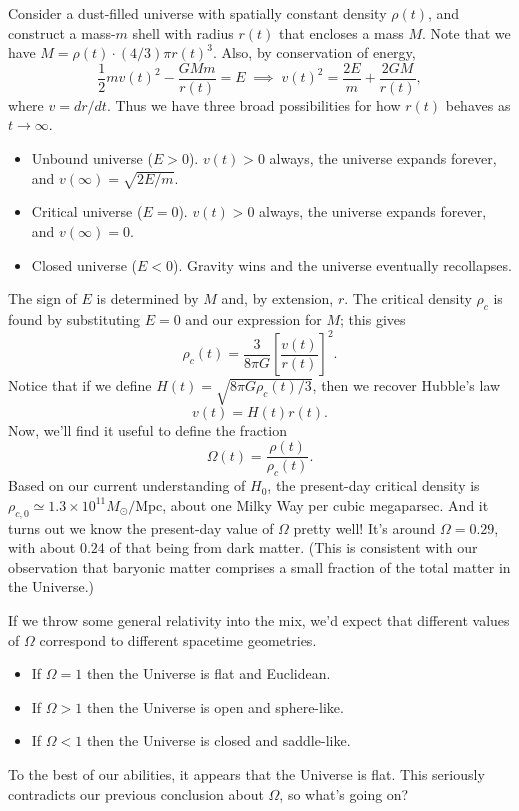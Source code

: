 \documentclass[../a062main.tex]{subfiles}
\begin{document}
Consider a dust-filled universe with spatially constant density $\rho(t)$, and construct a mass-$m$ shell with radius $r(t)$ that encloses a mass $M$.
Note that we have $M = \rho(t) \cdot (4 / 3)\pi r(t)^3$.
Also, by conservation of energy,
\[ \frac{1}{2}mv(t)^2 - \frac{GMm}{r(t)} = E \;\implies\; v(t)^2 = \frac{2E}{m} + \frac{2GM}{r(t)}, \]
where $v = dr / dt$.
Thus we have three broad possibilities for how $r(t)$ behaves as $t \to \infty$.
\begin{itemize}
    \item Unbound universe ($E > 0$).
    $v(t) > 0$ always, the universe expands forever, and $v(\infty) = \sqrt{2E / m}$.
    
    \item Critical universe ($E = 0$).
    $v(t) > 0$ always, the universe expands forever, and $v(\infty) = 0$.

    \item Closed universe ($E < 0$).
    Gravity wins and the universe eventually recollapses.
\end{itemize}
The sign of $E$ is determined by $M$ and, by extension, $r$.
The critical density $\rho_c$ is found by substituting $E = 0$ and our expression for $M$; this gives
\[ \rho_c(t) = \frac{3}{8\pi G} \left[ \frac{v(t)}{r(t)} \right]^2. \]
Notice that if we define $H(t) = \sqrt{8\pi G \rho_c(t) / 3}$, then we recover Hubble's law
\[ v(t) = H(t) r(t). \]
Now, we'll find it useful to define the fraction
\[ \Omega(t) = \frac{\rho(t)}{\rho_c(t)}. \] 
Based on our current understanding of $H_0$, the present-day critical density is $\rho_{c,0} \simeq 1.3 \times 10^{11} M_\odot / \textrm{Mpc}$, about one Milky Way per cubic megaparsec.
And it turns out we know the present-day value of $\Omega$ pretty well!
It's around $\Omega = 0.29$, with about $0.24$ of that being from dark matter.
(This is consistent with our observation that baryonic matter comprises a small fraction of the total matter in the Universe.)

If we throw some general relativity into the mix, we'd expect that different values of $\Omega$ correspond to different spacetime geometries.
\begin{itemize}
    \item If $\Omega = 1$ then the Universe is flat and Euclidean.
    \item If $\Omega > 1$ then the Universe is open and sphere-like.
    \item If $\Omega < 1$ then the Universe is closed and saddle-like.
\end{itemize}
To the best of our abilities, it appears that the Universe is flat.
This seriously contradicts our previous conclusion about $\Omega$, so what's going on?
\end{document}
